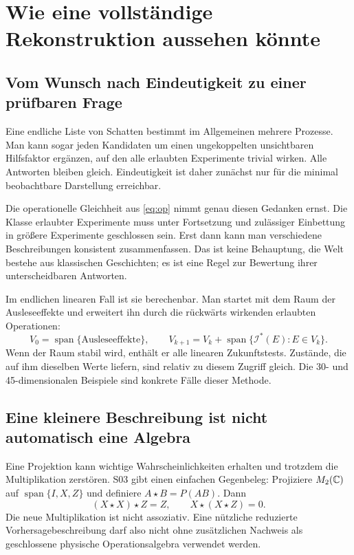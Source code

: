 \chapter{Wie eine vollständige Rekonstruktion aussehen könnte}
\label{ch:recon}
\section{Vom Wunsch nach Eindeutigkeit zu einer prüfbaren Frage}
Eine endliche Liste von Schatten bestimmt im Allgemeinen mehrere Prozesse. Man kann sogar jeden Kandidaten um einen ungekoppelten unsichtbaren Hilfsfaktor ergänzen, auf den alle erlaubten Experimente trivial wirken. Alle Antworten bleiben gleich. Eindeutigkeit ist daher zunächst nur für die minimal beobachtbare Darstellung erreichbar.

Die operationelle Gleichheit aus \eqref{eq:op} nimmt genau diesen Gedanken ernst. Die Klasse erlaubter Experimente muss unter Fortsetzung und zulässiger Einbettung in größere Experimente geschlossen sein. Erst dann kann man verschiedene Beschreibungen konsistent zusammenfassen. Das ist keine Behauptung, die Welt bestehe aus klassischen Geschichten; es ist eine Regel zur Bewertung ihrer unterscheidbaren Antworten.

Im endlichen linearen Fall ist sie berechenbar. Man startet mit dem Raum der Ausleseeffekte und erweitert ihn durch die rückwärts wirkenden erlaubten Operationen:
\begin{equation}
V_0=\operatorname{span}\{\text{Ausleseeffekte}\},\qquad
V_{k+1}=V_k+\operatorname{span}\{\mathcal I^*(E):E\in V_k\}.
\end{equation}
Wenn der Raum stabil wird, enthält er alle linearen Zukunftstests. Zustände, die auf ihm dieselben Werte liefern, sind relativ zu diesem Zugriff gleich. Die 30- und 45-dimensionalen Beispiele sind konkrete Fälle dieser Methode. 

\section{Eine kleinere Beschreibung ist nicht automatisch eine Algebra}
Eine Projektion kann wichtige Wahrscheinlichkeiten erhalten und trotzdem die Multiplikation zerstören. S03 gibt einen einfachen Gegenbeleg: Projiziere $M_2(\mathbb C)$ auf $\operatorname{span}\{I,X,Z\}$ und definiere $A\star B=P(AB)$. Dann
\begin{equation}
(X\star X)\star Z=Z,\qquad X\star(X\star Z)=0.
\end{equation}
Die neue Multiplikation ist nicht assoziativ. Eine nützliche reduzierte Vorhersagebeschreibung darf also nicht ohne zusätzlichen Nachweis als geschlossene physische Operationsalgebra verwendet werden.

